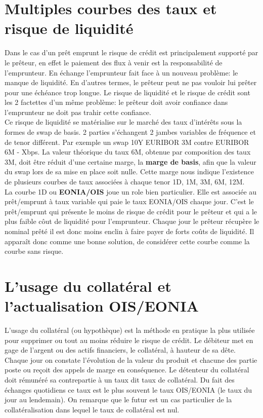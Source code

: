 \documentclass{article}
\begin{document}
\section*{Multiples courbes des taux et risque de liquidité}

Dans le cas d’un prêt emprunt le risque de crédit est principalement supporté par le prêteur, en effet le paiement des flux à venir est la responsabilité de l’emprunteur. En échange l’emprunteur fait face à un nouveau problème: le manque de liquidité. En d’autres termes, le prêteur peut ne pas vouloir lui prêter pour une échéance trop longue. Le risque de liquidité et le risque de crédit sont les 2 factettes d’un même problème: le prêteur doit avoir confiance dans l’emprunteur ne doit pas trahir cette confiance.\\

Ce risque de liquidité se matérialise sur le marché des taux d’intérêts sous la formes de swap de basis. 2 parties s’échangent 2 jambes variables de fréquence et de tenor différent. Par exemple un swap 10Y EURIBOR 3M contre EURIBOR 6M - Xbps. La valeur théorique du taux 6M, obtenue par composition des taux 3M, doit être réduit d’une certaine marge, la \textbf{marge de basis}, afin que la valeur du swap lors de sa mise en place soit nulle. Cette marge nous indique l’existence de plusieurs courbes de taux associées à chaque tenor 1D, 1M, 3M, 6M, 12M.\\

La courbe 1D ou \textbf{EONIA/OIS} joue un role bien particulier. Elle est associée au prêt/emprunt à taux variable qui paie le taux EONIA/OIS chaque jour. C’est le prêt/emprunt qui présente le moins de risque de crédit pour le prêteur et qui a le plus faible côut de liquidité pour l’emprunteur. Chaque jour le prêteur récupère le nominal prêté il est donc moins enclin à faire payer de forts coûts de liquidité. Il apparaît donc comme une bonne solution, de considérer cette courbe comme la courbe sans risque.


\section*{L’usage du collatéral et l’actualisation OIS/EONIA}

L’usage du collatéral (ou hypothèque) est la méthode en pratique la plus utilisée pour supprimer ou tout au moins réduire le risque de crédit. Le débiteur met en gage de l’argent ou des actifs financiers, le collatéral, à hauteur de sa dête. Chaque jour on constate l’évolution de la valeur du produit et chacune des partie poste ou reçoit des appels de marge en conséquence. Le détenteur du collatéral doit rémunéré sa contrepartie à un taux dit taux de collatéral. Du fait des échanges quotidiens ce taux est le plus souvent le taux OIS/EONIA (le taux du jour au lendemain). On remarque que le futur est un cas particulier de la collatéralisation dans lequel le taux de collatéral est nul.\\
\end{document}
